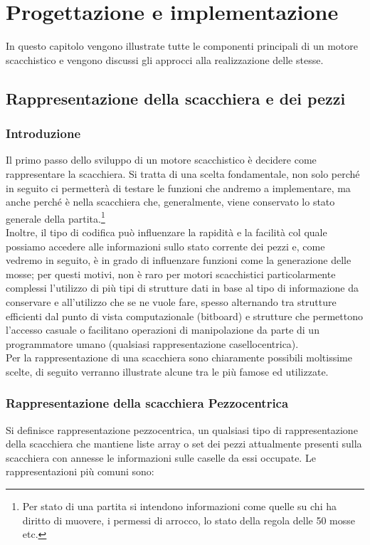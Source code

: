 \chapter{Progettazione e implementazione}
%

\begin{citazione}
    In questo capitolo vengono illustrate tutte le componenti principali di un motore scacchistico e vengono discussi gli approcci alla realizzazione delle stesse.
\end{citazione}

\newpage
\section{Rappresentazione della scacchiera e dei pezzi}

\subsection{Introduzione} %
Il primo passo dello sviluppo di un motore scacchistico è decidere come rappresentare la scacchiera. Si tratta di una scelta fondamentale, non solo perché in seguito ci permetterà
di testare le funzioni che andremo a implementare, ma anche perché è nella scacchiera che, generalmente,
viene conservato lo stato generale della partita.\footnote{Per stato di una partita si intendono informazioni come
    quelle su chi ha diritto di muovere, i permessi di arrocco, lo stato della regola delle 50 mosse etc.}
\\Inoltre, il tipo di codifica può influenzare la rapidità
e la facilità col quale possiamo accedere alle informazioni sullo stato corrente dei pezzi
e, come vedremo in seguito, è in grado di influenzare funzioni come la generazione delle mosse; per questi motivi,
non è raro per motori scacchistici particolarmente complessi l'utilizzo di più tipi di strutture dati in base
al tipo di informazione da conservare e all'utilizzo che se ne vuole fare, spesso alternando tra strutture efficienti dal punto di vista computazionale (bitboard) e strutture che permettono l'accesso casuale o facilitano 
operazioni di manipolazione da parte di un programmatore umano (qualsiasi rappresentazione casellocentrica).
\\Per la rappresentazione di una scacchiera sono chiaramente possibili moltissime scelte, di seguito
verranno illustrate alcune tra le più famose ed utilizzate.

\subsection{Rappresentazione della scacchiera Pezzocentrica}
Si definisce rappresentazione pezzocentrica, un qualsiasi tipo di rappresentazione della scacchiera che mantiene liste
array o set dei pezzi attualmente presenti sulla scacchiera con annesse le informazioni sulle caselle da essi occupate.
Le rappresentazioni più comuni sono:
